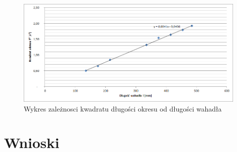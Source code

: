 \documentclass[a4paper,10pt,twoside]{article}
\begin{document}
\begin{figure}[!htp]
\centerline{\includegraphics[scale=1]{wykres2.png}}
\caption{Wykres zależnosci kwadratu długości okresu od długości wahadła}
\label{fig:ttl}
\end{figure}

\section{Wnioski}
\end{document}
